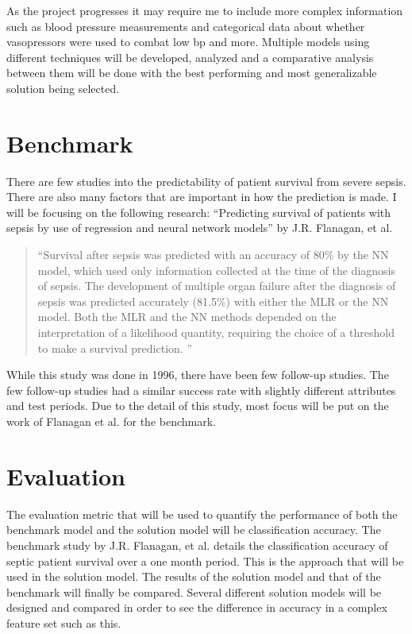 \documentclass[11pt]{article}
\begin{document}
	As the project progresses it may require me to include more complex information such as blood pressure measurements and categorical data about whether vasopressors were used to combat low bp and more.
	Multiple models using different techniques will be developed, analyzed and a comparative analysis between them will be done with the best performing and most generalizable solution being selected.
	
	\section{Benchmark}
	There are few studies into the predictability of patient survival from severe sepsis. There are also many factors that are important in how the prediction is made. I will be focusing on the following research: ``Predicting survival of patients with sepsis by use of regression and neural network models'' by J.R. Flanagan, et al. 
	\begin{quotation}
		``Survival after sepsis was predicted with an accuracy of 80\% by the NN model, which used only information collected at the time of the diagnosis of sepsis. The development of multiple organ failure after the diagnosis of sepsis was predicted accurately (81.5\%) with either the MLR or the NN model. Both the MLR and the NN methods depended on the interpretation of a likelihood quantity, requiring the choice of a threshold to make a survival prediction. ''\cite{sepsisresearch}
	\end{quotation}
	
	While this study was done in 1996, there have been few follow-up studies. The few follow-up studies had a similar success rate with slightly different attributes and test periods. Due to the detail of this study, most focus will be put on the work of Flanagan et al. for the benchmark.
	
	\section{Evaluation}
	The evaluation metric that will be used to quantify the performance of both the benchmark model and the solution model will be classification accuracy. The benchmark study by J.R. Flanagan, et al. details the classification accuracy of septic patient survival over a one month period. This is the approach that will be used in the solution model. The results of the solution model and that of the benchmark will finally be compared. Several different solution models will be designed and compared in order to see the difference in accuracy in a complex feature set such as this.
	
\end{document}
